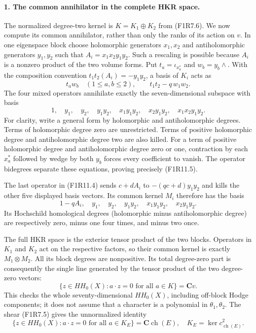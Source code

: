 \paragraph{1. The common annihilator in the complete HKR space.}
The normalized degree-two kernel is
$K=K_1\oplus K_2$ from (F1R7.6). We now compute its common
annihilator, rather than only the ranks of its action on $v$.
In one eigenspace block choose holomorphic generators $x_1,x_2$
and antiholomorphic generators $y_1,y_2$ such that
$A_i=x_1x_2y_1y_2$. Such a rescaling is possible because $A_i$
is a nonzero product of the two volume forms. Put
$t_a=\iota_{x_a^*}$ and $w_b=y_b\wedge$. With the composition
convention $t_1t_2(A_i)=-y_1y_2$, a basis of $K_i$ acts as
\[
 t_aw_b\quad(1\le a,b\le2),\qquad
                  t_1t_2-q\,w_1w_2.
 \tag{F1R11.4}
\]
The four mixed operators annihilate exactly the seven-dimensional
subspace with basis
\[
 1,\quad y_1,\quad y_2,\quad y_1y_2,\quad
 x_1y_1y_2,\quad x_2y_1y_2,\quad x_1x_2y_1y_2.
 \tag{F1R11.5}
\]
For clarity, write a general form by holomorphic and
antiholomorphic degrees. Terms of holomorphic degree zero
are unrestricted. Terms of positive holomorphic degree and
antiholomorphic degree two are also killed. For a term of
positive holomorphic degree and antiholomorphic degree zero
or one, contraction by each $x_a^*$ followed by wedge by
both $y_b$ forces every coefficient to vanish. The operator
bidegrees separate these equations, proving precisely
(F1R11.5).

The last operator in (F1R11.4) sends $c+dA_i$ to
$-(qc+d)y_1y_2$ and kills the other five displayed basis
vectors. Its common kernel $M_i$ therefore has the basis
\[
 1-qA_i,\quad y_1,\quad y_2,\quad y_1y_2,\quad
 x_1y_1y_2,\quad x_2y_1y_2.
 \tag{F1R11.6}
\]
Its Hochschild homological degrees (holomorphic minus
antiholomorphic degree) are respectively zero, minus one
four times, and minus two once.

The full HKR space is the exterior tensor product of the
two blocks. Operators in $K_1$ and $K_2$ act on the respective
factors, so their common kernel is exactly $M_1\otimes M_2$.
All its block degrees are nonpositive. Its total degree-zero
part is consequently the single line generated by the
tensor product of the two degree-zero vectors:
\[
 \{z\in HH_0(X):a\cdot z=0\text{ for all }a\in K\}
                    =\mathbf C v.
 \tag{F1R11.7}
\]
This checks the whole seventy-dimensional $HH_0(X)$, including
off-block Hodge components; it does not assume that a
character is a polynomial in $\theta_1,\theta_2$.
The shear (F1R7.5) gives the unnormalized identity
\[
 \{z\in HH_0(X):a\cdot z=0\text{ for all }a\in K_E\}
                    =\mathbf C\operatorname{ch}(E),
 \quad K_E=\ker c^2_{\operatorname{ch}(E)}.
 \tag{F1R11.8}
\]

